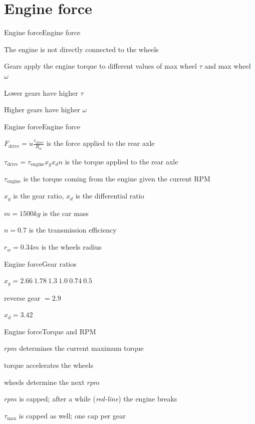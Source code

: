 \documentclass{beamer}
\begin{document}
\section{Engine force}
\begin{slide}{Engine force}{Engine force}{
\item The engine is not directly connected to the wheels
\item Gears apply the engine torque to different values of max wheel $\tau$ and max wheel $\omega$
\item Lower gears have higher $\tau$
\item Higher gears have higher $\omega$
}\end{slide}

\begin{slide}{Engine force}{Engine force}{
\item $F_{\text{drive}} = u \frac{\tau_{\text{drive}}}{R_w}$ is the force applied to the rear axle
\item $\tau_{\text{drive}} = \tau_{\text{engine}} x_g x_d n$ is the torque applied to the rear axle
\item $\tau_{\text{engine}}$ is the torque coming from the engine given the current RPM
\item $x_g$ is the gear ratio, $x_d$ is the differential ratio
\item $m=1500kg$ is the car mass
\item $n=0.7$ is the transmission efficiency
\item $r_w = 0.34m$ is the wheels radius
}\end{slide}

\begin{slide}{Engine force}{Gear ratios}{
\item $x_g = 2.66\ 1.78\ 1.3\ 1.0\ 0.74\ 0.5$
\item reverse gear $ = 2.9$
\item $x_d = 3.42$
}\end{slide}

\begin{slide}{Engine force}{Torque and RPM}{
\item $rpm$ determines the current maximum torque
\item torque accelerates the wheels
\item wheels determine the next $rpm$
\item $rpm$ is capped; after a while (\textit{red-line}) the engine breaks
\item $\tau_{\text{max}}$ is capped as well; one cap per gear
}\end{slide}
\end{document}
